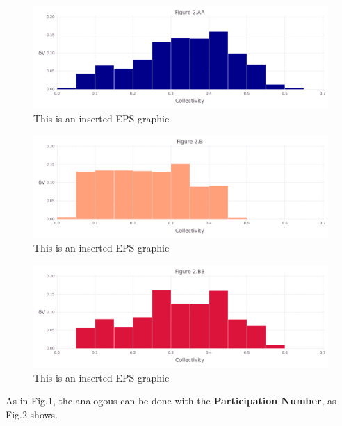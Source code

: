 \documentclass[10pt,letterpaper]{article}
\begin{document}
\begin{figure}[ht]
\begin{center}
\includegraphics[scale=0.5]{1hvr_hol/2aafigure_hi-precision.pdf}
\caption{This is an inserted EPS graphic}
\label{fig4}
\end{center}
\end{figure}

\begin{figure}[ht]
\begin{center}
\includegraphics[scale=0.5]{1hvr_hol/2bfigure_hi-precision.pdf}
\caption{This is an inserted EPS graphic}
\label{fig5}
\end{center}
\end{figure}

\begin{figure}[ht]
\begin{center}
\includegraphics[scale=0.5]{1hvr_hol/2bbfigure_hi-precision.pdf}
\caption{This is an inserted EPS graphic}
\label{fig6}
\end{center}
\end{figure}

\clearpage
As in Fig.1, the analogous can be done with the \textbf{Participation Number}, as Fig.2 shows.
\end{document}
